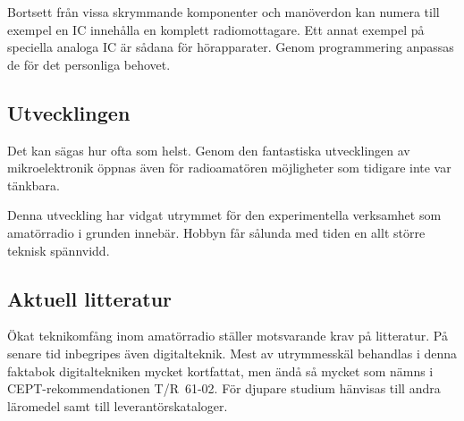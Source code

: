 Bortsett från vissa skrymmande komponenter och manöverdon kan numera till
exempel en IC innehålla en komplett radiomottagare.
Ett annat exempel på speciella analoga IC är sådana för hörapparater.
Genom programmering anpassas de för det personliga behovet.

\subsection{Utvecklingen}

Det kan sägas hur ofta som helst.
Genom den fantastiska utvecklingen av mikroelektronik öppnas även för
radioamatören möjligheter som tidigare inte var tänkbara.

Denna utveckling har vidgat utrymmet för den experimentella verksamhet som
amatörradio i grunden innebär.
Hobbyn får sålunda med tiden en allt större teknisk spännvidd.

\subsection{Aktuell litteratur}

Ökat teknikomfång inom amatörradio ställer motsvarande krav på litteratur.
På senare tid inbegripes även digitalteknik.
Mest av utrymmesskäl behandlas i denna faktabok digitaltekniken mycket
kortfattat, men ändå så mycket som nämns i CEPT-rekommendationen T/R~61-02.
För djupare studium hänvisas till andra läromedel samt till
leverantörskataloger.
